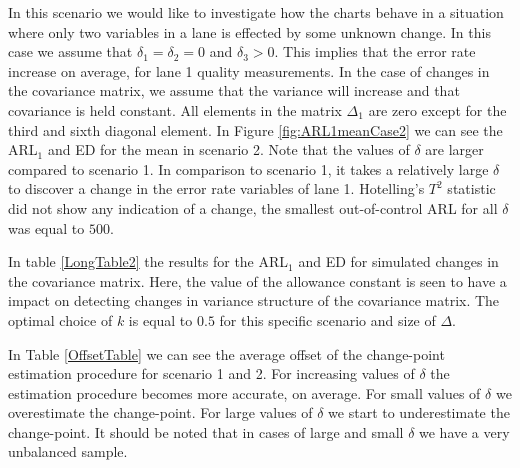 \documentclass[a4paper,11pt,fleqn,twoside,notitlepage]{report}
\begin{document}
In this scenario we would like to investigate how the charts behave in a situation where only two variables in a lane is effected by some unknown change. In this case we assume that $\delta_1=\delta_2=0$ and $\delta_3>0$. This implies that the error rate increase on average, for lane 1 quality measurements. In the case of changes in the covariance matrix, we assume that the variance will increase and that covariance is held constant. All elements in the matrix $\Delta_1$ are zero except for the third and sixth diagonal element. In Figure \ref{fig:ARL1meanCase2} we can see the ARL$_1$ and ED for the mean in scenario 2. Note that the values of $\delta$ are larger compared to scenario 1. In comparison to scenario 1, it takes a relatively large $\delta$ to discover a change in the error rate variables of lane 1. Hotelling's $T^2$ statistic did not show any indication of a change, the smallest out-of-control ARL for all $\delta$ was equal to $500$.

In table \ref{LongTable2} the results for the ARL$_1$ and ED for simulated changes in the covariance matrix. Here, the value of the allowance constant is seen to have a impact on detecting changes in variance structure of the covariance matrix. The optimal choice of $k$ is equal to $0.5$ for this specific scenario and size of $\Delta$. 

In Table \ref{OffsetTable} we can see the average offset of the change-point estimation procedure for scenario 1 and 2. For increasing values of $\delta$ the estimation procedure becomes more accurate, on average. For small values of $\delta$ we overestimate the change-point. For large values of $\delta$ we start to underestimate the change-point. It should be noted that in cases of large and small $\delta$ we have a very unbalanced sample. 
\end{document}
